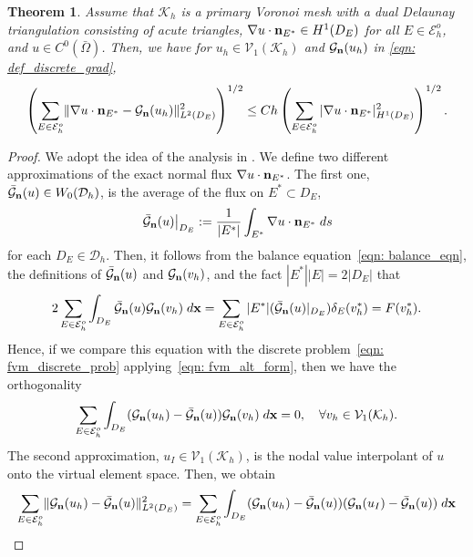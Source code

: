 \documentclass[a4paper]{article}
\theoremstyle{plain}
\newtheorem{theorem}{Theorem}[section]
\theoremstyle{definition}
\numberwithin{equation}{section}
\newcommand{\bx}{{\bf x}}
\newcommand{\bn}{{\bf n}}
\newcommand{\Kh}{\mathcal{K}_h}
\newcommand{\Eho}{\mathcal{E}_h^o}
\newcommand{\norm}[1]{\lVert #1\rVert}
\newcommand{\snorm}[1]{|#1|}
\begin{document}
\begin{theorem}\label{thm: fvm_conver_analy}
Assume that $\mathcal{K}_h$ is a primary Voronoi mesh with a dual Delaunay triangulation consisting of acute triangles, $\nabla u\cdot \bn_{E^*}\in H^1(D_E)$ for all $E\in \Eho$, and $u\in C^0(\bar{\Omega})$. Then, we have for $u_h\in \mathcal V_1(\Kh)$ and $\mathcal{G}_\bn(u_h)$ in \eqref{eqn: def_discrete_grad},
\begin{equation*}
\left(\sum_{E\in\Eho}\norm{\nabla u \cdot {\mathbf n}_{E^*}-\mathcal{G}_{\bn}(u_h)}^2_{L^2(D_E)}\right)^{1/2}\leq Ch\left(\sum_{E\in\Eho}\snorm{\nabla u\cdot {\mathbf n}_{E^*}}^2_{H^1(D_E)}\right)^{1/2}.
\end{equation*}
\end{theorem}

\begin{proof}
We adopt the idea of the analysis in \cite{brezzi2006error}.
We define two different approximations of the exact normal flux $\nabla u\cdot \bn_{E^*}$.
The first one, $\bar{\mathcal{G}}_{\bn}(u)\in W_0(\mathcal{D}_h)$, is the average of the flux on $E^*\subset D_E$,
\begin{equation*}
\left.\bar{\mathcal{G}}_{\bn}(u)\right|_{D_E}:=\frac{1}{|E^*|}\int_{E^*} \nabla u\cdot\bn_{E^*}\;{\rm d}s
\end{equation*}
for each $D_E\in \mathcal{D}_h$. 
Then, it follows from the balance equation~\eqref{eqn: balance_eqn}, the definitions of $\bar{\mathcal{G}}_{\bn}(u)$ and $\mathcal{G}_{\bn}(v_h)$, and the fact $|E^*||E|=2|D_E|$ that
\begin{align*}
2\sum_{E\in\Eho}\int_{D_E}\bar{\mathcal{G}}_{\bn}(u)\mathcal{G}_{\bn}(v_h)\;{\rm d}\mathbf{x}=\sum_{E\in \Eho}|E^*|(\bar{\mathcal{G}}_{\bn}(u)|_{D_E})\delta_E(v_h^{*})=F(v_h^*).
\end{align*}
Hence, if we compare this equation with the discrete problem~\eqref{eqn: fvm_discrete_prob} applying~\eqref{eqn: fvm_alt_form}, then we have the orthogonality
\begin{equation*}
\sum_{E\in \Eho}\int_{D_E} (\mathcal{G}_{\bn}(u_h)-\bar{\mathcal{G}}_{\bn}(u)) \mathcal{G}_{\bn}(v_h)\;{\rm d}\mathbf{x}=0, \quad \forall v_h\in \mathcal V_1(\mathcal{K}_h).
\end{equation*}
The second approximation, $u_I\in \mathcal V_1(\Kh)$, is the nodal value interpolant of $u$ onto the virtual element space.
Then, we obtain
\begin{align*}
\sum_{E\in\Eho}\norm{\mathcal{G}_{\bn}(u_h)-\bar{\mathcal{G}}_{\bn}(u)}&^2_{L^2(D_E)}=\sum_{E\in\Eho}\int_{D_E}(\mathcal{G}_{\bn}(u_h)-\bar{\mathcal{G}}_{\bn}(u)) (\mathcal{G}_{\bn}(u_I)-\bar{\mathcal{G}}_{\bn}(u))\;{\rm d}\bx\\

\end{align*}
\end{proof}
\end{document}
